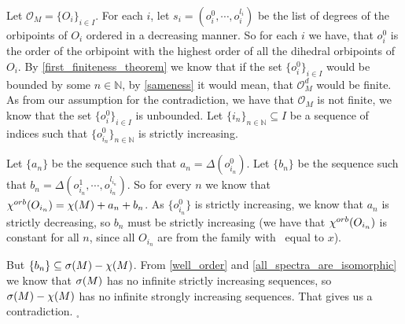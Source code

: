 
Let $\mathcal{O}_M = \{O_i\}_{i \in I}$. 
For each $i$, let $s_i = (o^0_i, \cdots, o^{l_i}_i)$ be the list of degrees of 
the orbipoints  
of $O_i$ ordered in a decreasing manner. 
So for each $i$ we have, that $o^0_i$ is 
the order of the orbipoint with the highest order of all the dihedral orbipoints of 
$O_i$. 
By \ref{first_finiteness_theorem} we know that if the set $\{o^0_i\}_{i \in I}$ 
would be bounded 
by some $n \in \mathbb{N}$, by \ref{sameness} 
it would mean, that $\mathcal{O}_M^d$ would be finite. As 
from our assumption for the contradiction, we have that $\mathcal{O}_M$ is not finite, we know
that the set $\{o^0_i\}_{i \in I}$ is unbounded. 
Let $\{i_n\}_{n\in \mathbb{N}} \subseteq I$ be a sequence of indices such that
$\{o^0_{i_n}\}_{n\in \mathbb{N}}$ is strictly increasing. 

Let $\{a_n\}$ be the sequence such that $a_n = \Delta(o^0_{i_n})$.
Let $\{b_n\}$ be the sequence such that $b_n = \Delta(o^1_{i_n},
\cdots, o^{l_{i_n}}_{i_n})$. 
So for every $n$ we know that ${\chi^{orb}(O_{i_n})} = \chi(M) + a_n + b_n$. As $\{o^0_{i_n}\}$ 
is strictly 
increasing, we know 
that $a_n$ is strictly decreasing, so $b_n$ must be strictly 
increasing  
(we have that ${\chi^{orb}(O_{i_n})}$ is constant for all $n$, since all $O_{i_n}$ 
are from the family with \Eoc\ equal to $x$). 

But $\{b_n\} \subseteq {{\sigma}(M)} - \chi(M)$. 
From \ref{well_order} and \ref{all_spectra_are_isomorphic} we know that ${{\sigma}(M)}$ has no infinite 
strictly increasing sequences, so 
${{\sigma}(M)} - \chi(M)$ has no infinite strongly increasing sequences. That gives us a 
contradiction. 
$_\square$ 



